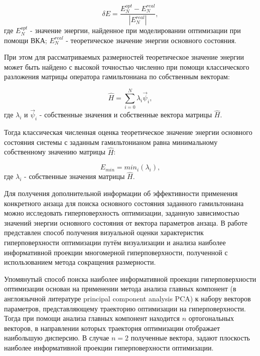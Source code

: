 \documentclass[14pt]{extarticle}
\begin{document}
\begin{equation}
\delta E = \frac{E^{opt}_N - E^{real}_N}{|E^{real}_N|}, 
\end{equation} где $E^{opt}_N$ - значение энергии, найденное при моделировании оптимизации при помощи ВКА; $E^{real}_N$ - теоретическое значение энергии основного состояния.

\qquad При этом для рассматриваемых размерностей теоретическое значение энергии может быть найдено с высокой точностью численно при помощи классического разложения матрицы оператора гамильтониана по собственным векторам:


\begin{equation}
\hat H = \sum_{i = 0}^N \lambda_{i} \vec{\psi}_{i}, \label{eq:delta_E}
\end{equation} где  $\lambda_{i}$ и $\vec{\psi}_{i}$ - собственные значения и собственные вектора матрицы $\hat H$.

\qquad Тогда классическая численная оценка теоретическое значение энергии основного состояния системы с заданным гамильтонианом равна минимальному собственному значению матрицы $\hat H$:

\begin{equation}
E_{min} = min_{i}(\lambda_{i}), 
\end{equation} где $\lambda_{i}$ - собственные значения матрицы $\hat H$.


\qquad Для получения дополнительной информации об эффективности применения конкретного анзаца для поиска основного состояния заданного гамильтониана можно исследовать гиперповерхность оптимизации, заданную зависимостью значений энергии основного состояния от вектора параметров анзаца. В работе \cite{https://doi.org/10.48550/arxiv.2111.04695} представлен способ получения визуальной оценки характеристик гиперповерхности оптимизации путём визуализации и анализа наиболее информативной проекции многомерной гиперповерхности, полученной с использованием метода сокращения размерности.

\qquad Упомянутый способ поиска наиболее информативной проекции гиперповерхности оптимизации основан на применении метода анализа главных компонент (в англоязычной литературе principal component analysis PCA) к набору векторов параметров, представляющему траекторию оптимизации на гиперповерхности. Тогда при помощи анализа главных компонент находится $n$ ортогональных векторов, в направлении которых траектория оптимизации отображает наибольшую дисперсию. В случае $n = 2$ полученные вектора, задают плоскость наиболее информативной проекции гиперповерхности оптимизации.
\end{document}
